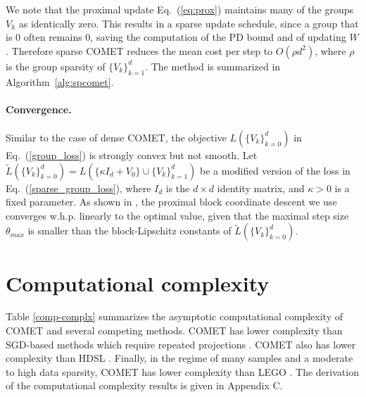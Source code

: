 \documentclass[twoside,11pt]{article}
\newcommand\mat[1]{{#1}}
\newcommand{\W}{\mat{W}}
\newcommand{\Vk}{\mat{V_k}}
\newcommand{\Vg}{\{\Vk\}_{k=0}^{d}} %
\newcommand{\Vgrc}{\{\Vk\}_{k=1}^{d}} %
\renewcommand{\eqref}[1]{Eq.~(\ref{#1})}
\begin{document}
We note that the proximal update \eqref{eq:prox} maintains many of the groups $V_k$ as identically zero. This results in a sparse update schedule, since a group that is $0$ often remains $0$, saving the computation of the PD bound and of updating $\W$. Therefore sparse COMET reduces the mean cost per step to $O(\rho d^2)$, where $\rho$ is the group sparsity of $\Vgrc$. The method is summarized in Algorithm~\ref{alg:spcomet}.

\paragraph{Convergence.}
Similar to the case of dense COMET, the objective $L(\Vg)$ in \eqref{group_loss} is strongly convex but not smooth. Let $\tilde{L}(\Vg) = L(\{\kappa I_d + V_0\} \cup \{V_k\}_{k=1}^d)$ be a modified version of the loss in \eqref{sparse_group_loss}, where $I_d$ is the $d \times d$ identity matrix, and $\kappa>0$ is a fixed parameter.
As shown in \cite[Theorem 7]{richtarik2014iteration}, the proximal block coordinate descent we use converges w.h.p. linearly to the optimal value, given that the maximal step size $\theta_{max}$ is smaller than the block-Lipschitz constants of $\tilde{L}(\Vg)$.


\vspace{-6pt}
\section{Computational complexity}\vskip -5pt

Table \ref{comp-complx} summarizes the asymptotic computational complexity of COMET and several competing methods. COMET has lower complexity than SGD-based methods which require repeated projections \citep{OASIS, qian}. COMET also has lower complexity than HDSL \citep{HDSL}.  Finally, in the regime of many samples and a moderate to high data sparsity, COMET has lower complexity than LEGO \citep{lego}. The derivation of the computational complexity results is given in Appendix C.
\end{document}
